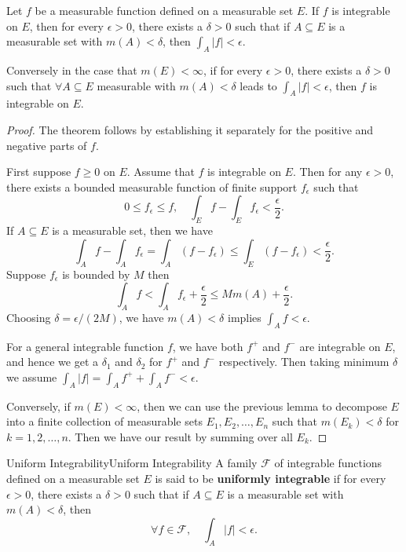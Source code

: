 \documentclass[../main.tex]{subfiles}
\begin{document}
\begin{proposition}{}{}
	Let $f$ be a measurable function defined on a measurable set $E$. If $f$ is integrable on $E$, then for every $\epsilon > 0$, there exists a $\delta > 0$ such that if $A \subseteq E$ is a measurable set with $m(A) < \delta$, then $\int_A |f| < \epsilon$.

	Conversely in the case that $m(E) < \infty$, if for every $\epsilon > 0$, there exists a $\delta > 0$ such that $\forall A \subseteq E$ measurable with $m(A) < \delta$ leads to $\int_A |f| < \epsilon$, then $f$ is integrable on $E$.
\end{proposition}
\begin{proof}
	The theorem follows by establishing it separately for the positive and negative parts of $f$.

	First suppose $f \geq 0$ on $E$. Assume that $f$ is integrable on $E$. Then for any $\epsilon > 0$, there exists a bounded measurable function of finite support $f_{\epsilon}$ such that
	\begin{equation*}
		0 \leq f_{\epsilon} \leq f, \quad \int_E f - \int_E f_{\epsilon} < \frac{\epsilon}{2}.
	\end{equation*}
	If $A \subseteq E$ is a measurable set, then we have
	\begin{equation*}
		\int_A f - \int_A f_{\epsilon} = \int_A (f - f_{\epsilon}) \leq \int_E (f - f_{\epsilon}) < \frac{\epsilon}{2}.
	\end{equation*}
	Suppose $f_{\epsilon}$ is bounded by $M$ then
	\begin{equation*}
		\int_A f < \int_A f_{\epsilon} + \frac{\epsilon}{2} \leq M m(A) + \frac{\epsilon}{2}.
	\end{equation*}
	Choosing $\delta = \epsilon / (2M)$, we have $m(A) < \delta$ implies $\int_A f < \epsilon$.

	For a general integrable function $f$, we have both $f^+$ and $f^-$ are integrable on $E$, and hence we get a $\delta_1$ and $\delta_2$ for $f^+$ and $f^-$ respectively. Then taking minimum $\delta$ we assume $\int_A |f| = \int_A f^+ + \int_A f^- < \epsilon$.

	Conversely, if $m(E) < \infty$, then we can use the previous lemma to decompose $E$ into a finite collection of measurable sets $E_1, E_2, \ldots, E_n$ such that $m(E_k) < \delta$ for $k = 1, 2, \ldots, n$. Then we have our result by summing over all $E_k$.
\end{proof}

\begin{definition}{Uniform Integrability}{Uniform Integrability}
	A family $\mathcal{F}$ of integrable functions defined on a measurable set $E$ is said to be \textbf{uniformly integrable} if for every $\epsilon > 0$, there exists a $\delta > 0$ such that if $A \subseteq E$ is a measurable set with $m(A) < \delta$, then
	\begin{equation}
		\forall f \in \mathcal{F}, \quad \int_A |f| < \epsilon.
	\end{equation}
\end{definition}
\end{document}
